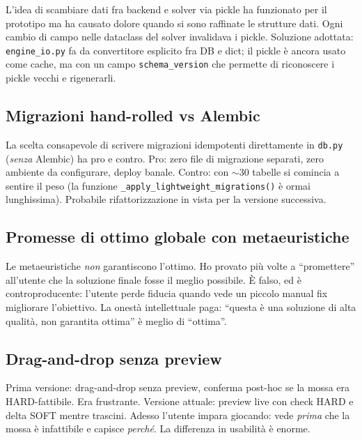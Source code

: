 L'idea di scambiare dati fra backend e solver via pickle ha
funzionato per il prototipo ma ha causato dolore quando si
sono raffinate le strutture dati. Ogni cambio di campo nelle
dataclass del solver invalidava i pickle. Soluzione
adottata: \texttt{engine\_io.py} fa da convertitore esplicito
fra DB e dict; il pickle \`e ancora usato come cache, ma con
un campo \texttt{schema\_version} che permette di
riconoscere i pickle vecchi e rigenerarli.

\subsection{Migrazioni hand-rolled vs Alembic}

La scelta consapevole di scrivere migrazioni idempotenti
direttamente in \texttt{db.py} (\emph{senza} Alembic) ha
pro e contro. Pro: zero file di migrazione separati, zero
ambiente da configurare, deploy banale. Contro: con
$\sim 30$ tabelle si comincia a sentire il peso (la funzione
\texttt{\_apply\_lightweight\_migrations()} \`e ormai
lunghissima). Probabile rifattorizzazione in vista per la
versione successiva.

\subsection{Promesse di ottimo globale con metaeuristiche}

\begin{erroricomunibox}
Le metaeuristiche \emph{non} garantiscono l'ottimo. Ho
provato pi\`u volte a ``promettere'' all'utente che la
soluzione finale fosse il meglio possibile. \`E falso, ed \`e
controproducente: l'utente perde fiducia quando vede un
piccolo manual fix migliorare l'obiettivo. La onest\`a
intellettuale paga: ``questa \`e una soluzione di alta
qualit\`a, non garantita ottima'' \`e meglio di ``ottima''.
\end{erroricomunibox}

\subsection{Drag-and-drop senza preview}

Prima versione: drag-and-drop senza preview, conferma
post-hoc se la mossa era HARD-fattibile. Era frustrante.
Versione attuale: preview live con check HARD e delta SOFT
mentre trascini. Adesso l'utente impara giocando: vede
\emph{prima} che la mossa \`e infattibile e capisce
\emph{perch\'e}. La differenza in usabilit\`a \`e enorme.

